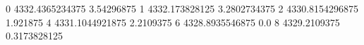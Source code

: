 0 4332.4365234375 3.54296875
1 4332.173828125 3.2802734375
2 4330.8154296875 1.921875
4 4331.1044921875 2.2109375
6 4328.8935546875 0.0
8 4329.2109375 0.3173828125
